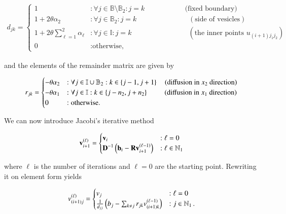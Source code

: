 \documentclass[11pt,english,a4paper]{article}
\begin{document}
\begin{flushleft}
\begin{align}
d_{jk} = \begin{cases} 
1 &:\forall j\in\mathbb{B}\setminus\mathbb{B}_2  : j=k \,\,\,\,\quad\qquad\qquad \text{(fixed boundary)}\\
1+ 2\theta \alpha_2 &: \forall j\in\mathbb{B}_2: j=k \,\,\quad\qquad\qquad\qquad (\text{side of vesicles}) \\ 
1+ 2\theta \sum_{\ell = 1}^2 \alpha_\ell &: \forall j\in\mathbb{I}: j=k \qquad\qquad\qquad\qquad (\text{the inner points }u_{(i+1)j_1j_2}) \\ 
 0 & : \text{otherwise,} \end{cases}
\label{eq_25}
\end{align}

and the elements of the remainder matrix are given by

\begin{align}
r_{jk} = \begin{cases} 
-\theta \alpha_2 &: \forall j\in\mathbb{I}\cup\mathbb{B}_2: k\in\left\lbrace{j-1,j+1}\right\rbrace\quad \text{(diffusion in $x_2$ direction)} \\ 
- \theta \alpha_1 &: \forall j\in\mathbb{I} : k \in \left\lbrace{j-n_2,j+n_2}\right\rbrace \,\,\qquad\text{(diffusion in $x_1$ direction)} \\
 0 & : \text{otherwise.} \end{cases}
\label{eq_26}
\end{align}

We can now introduce Jacobi's iterative method

\begin{align*}
\textbf{v}_{i+1}^{(\ell)} = \begin{cases}
\textbf{v}_i &: \ell=0 \\
\textbf{D}^{-1}\left({\textbf{b}_i-\textbf{R}\textbf{v}_{i+1}^{(\ell-1)}}\right) &: \ell\in\mathbb{N}_1
\end{cases}
\end{align*}

where $\ell$ is the number of iterations and $\ell=0$ are the starting point. Rewriting it on element form yields

\begin{align*}
v_{(i+1)j}^{(\ell)} = \begin{cases} v_j &: \ell = 0 \\ \frac{1}{d_{jj}}\left({b_j - \sum_{k\neq j} r_{jk} v_{(i+1)k}^{(\ell-1)}}\right) &: j\in\mathbb{N}_1 \,.\end{cases}
\end{align*}


\end{flushleft}
\end{document}
